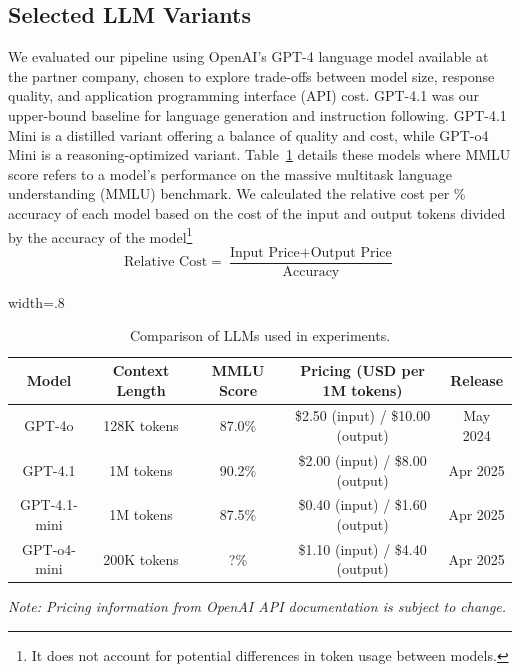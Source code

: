 \documentclass[final,5p,times,twopage,twocolumn,a4paper]{elsarticle}
\begin{document}
\subsection{Selected LLM Variants}
We evaluated our pipeline using OpenAI's GPT-4 language model available at the partner company, chosen to explore trade-offs between model size, response quality, and application programming interface (API) cost. GPT-4.1 was our upper-bound baseline for language generation and instruction following. GPT-4.1 Mini is a distilled variant offering a balance of quality and cost, while GPT-o4 Mini is a reasoning-optimized variant. Table~\ref{tab:llm-comparison-exp} details these models where MMLU score refers to a model's performance on the massive multitask language understanding (MMLU) benchmark. We calculated the relative cost per \% accuracy of each model based on the cost of the input and output tokens divided by the accuracy of the model\footnote{It does not account for potential differences in token usage between models.}
%
\[
\text{Relative Cost} = \frac{\text{Input Price} + \text{Output Price}}{\text{Accuracy}}
\]
%

\begin{table}[!hbt]
\centering
\caption{Comparison of LLMs used in experiments.}
\label{tab:llm-comparison-exp}
\begin{adjustbox}{width=.8\textwidth}
\begin{tabular}{|c|c|c|c|c|}
\hline
\textbf{Model} & \textbf{Context Length} & \textbf{MMLU Score} & \textbf{Pricing (USD per 1M tokens)} & \textbf{Release} \\ \hline
GPT-4o         & 128K tokens             & 87.0\%              & \$2.50 (input) / \$10.00 (output)        & May 2024         \\ \hline
GPT-4.1        & 1M tokens               & 90.2\%              & \$2.00 (input) / \$8.00 (output)         & Apr 2025         \\ \hline
GPT-4.1-mini   & 1M tokens               & 87.5\%              & \$0.40 (input) / \$1.60 (output)         & Apr 2025         \\ \hline
GPT-o4-mini    & 200K tokens             & ?\%                 & \$1.10 (input) / \$4.40 (output)         & Apr 2025         \\ \hline
\end{tabular}
\end{adjustbox}
\parbox{0.9\linewidth}{
\small \textit{Note: Pricing information from OpenAI API documentation is subject to change.}
}
\end{table}
\end{document}
